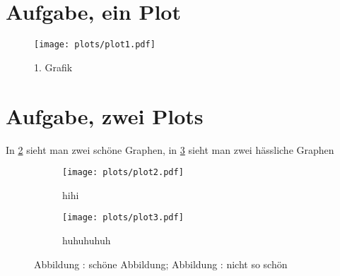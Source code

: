 \documentclass{scrartcl}
\begin{document}
\section{Aufgabe, ein Plot}
  \begin{figure}
    \centering
    \texttt{[image: plots/plot1.pdf]}
    \caption{1. Grafik}
    \label{fig:1}
  \end{figure}
  \newpage

\section{ Aufgabe, zwei Plots}

In \ref{fig:hihi} sieht man zwei schöne Graphen,
in \ref{fig:huhu} sieht man zwei hässliche Graphen

\begin{figure}
  \centering
  \begin{subfigure}{0.48\textwidth}
    \centering
    \texttt{[image: plots/plot2.pdf]}
    \caption{hihi}
    \label{fig:hihi}
  \end{subfigure}
  \begin{subfigure}{0.48\textwidth}
    \centering
    \texttt{[image: plots/plot3.pdf]}
    \caption{huhuhuhuh}
    \label{fig:huhu}
  \end{subfigure}
  \caption{Abbildung : schöne Abbildung;
  Abbildung : nicht so schön}
  \label{fig:logos}
\end{figure}
\end{document}
